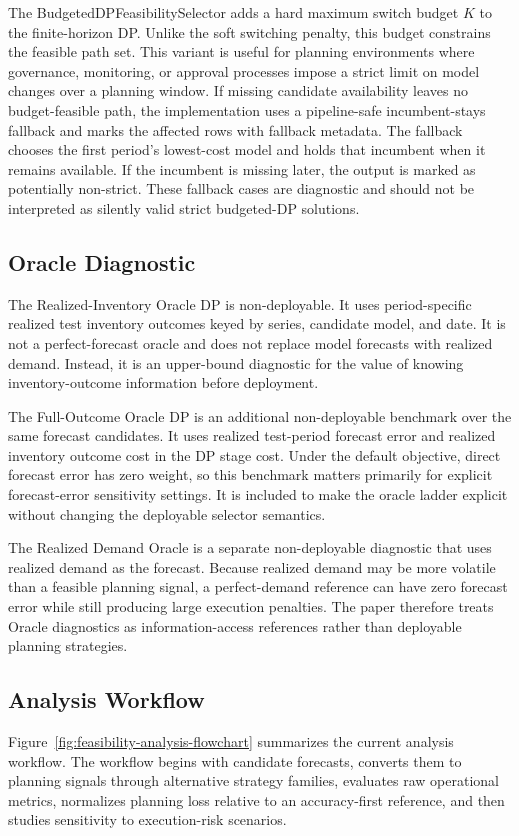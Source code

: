 The BudgetedDPFeasibilitySelector adds a hard maximum switch budget $K$ to the finite-horizon DP. Unlike the soft switching penalty, this budget constrains the feasible path set. This variant is useful for planning environments where governance, monitoring, or approval processes impose a strict limit on model changes over a planning window. If missing candidate availability leaves no budget-feasible path, the implementation uses a pipeline-safe incumbent-stays fallback and marks the affected rows with fallback metadata. The fallback chooses the first period's lowest-cost model and holds that incumbent when it remains available. If the incumbent is missing later, the output is marked as potentially non-strict. These fallback cases are diagnostic and should not be interpreted as silently valid strict budgeted-DP solutions.

\subsection{Oracle Diagnostic}

The Realized-Inventory Oracle DP is non-deployable. It uses period-specific realized test inventory outcomes keyed by series, candidate model, and date. It is not a perfect-forecast oracle and does not replace model forecasts with realized demand. Instead, it is an upper-bound diagnostic for the value of knowing inventory-outcome information before deployment.

The Full-Outcome Oracle DP is an additional non-deployable benchmark over the same forecast candidates. It uses realized test-period forecast error and realized inventory outcome cost in the DP stage cost. Under the default objective, direct forecast error has zero weight, so this benchmark matters primarily for explicit forecast-error sensitivity settings. It is included to make the oracle ladder explicit without changing the deployable selector semantics.

The Realized Demand Oracle is a separate non-deployable diagnostic that uses realized demand as the forecast. Because realized demand may be more volatile than a feasible planning signal, a perfect-demand reference can have zero forecast error while still producing large execution penalties. The paper therefore treats Oracle diagnostics as information-access references rather than deployable planning strategies.

\subsection{Analysis Workflow}

Figure~\ref{fig:feasibility-analysis-flowchart} summarizes the current analysis workflow. The workflow begins with candidate forecasts, converts them to planning signals through alternative strategy families, evaluates raw operational metrics, normalizes planning loss relative to an accuracy-first reference, and then studies sensitivity to execution-risk scenarios.


